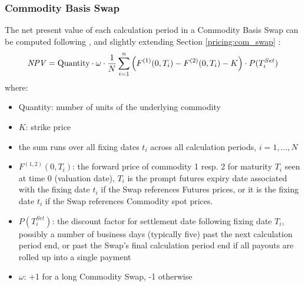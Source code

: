 \subsubsection{Commodity Basis Swap}
\label{pricing:com_basisswap}

The net present value of each calculation period in a Commodity Basis Swap 
can be computed following \cite{Clark_2014}, and slightly extending
Section \ref{pricing:com_swap}
:
$$
\mathit{NPV} = \mbox{Quantity}\cdot \omega\cdot \frac{1}{N}\sum_{i=1}^n
  \left(F^{(1)}(0,T_i) - F^{(2)}(0,T_i) - K\right) \cdot P(T_i^{Set})
$$
where:
\begin{itemize}
\item Quantity: number of units of the underlying commodity
\item $K$: strike price
\item the sum runs over all fixing dates $t_i$ across all calculation
  periods, $i=1, ..., N$
\item $F^{(1,2)}(0,T_i)$: the forward price of commodity 1 resp. 2 for
  maturity $T_i$ seen at time 0 (valuation date), $T_i$ is the prompt
  futures expiry date  associated with the fixing date $t_i$ if the
  Swap references Futures  prices, or it is the fixing date $t_i$ if
  the  Swap references Commodity spot prices.
\item $P(T_i^{Set})$: the discount factor for settlement date
  following fixing date $T_i$, possibly a number of business days
  (typically five) past the next calculation period end, or past the
  Swap's final calculation period  end if all payouts are rolled up
  into a single payment 
\item $\omega$: +1 for a long Commodity Swap, -1 otherwise 
\end{itemize}
